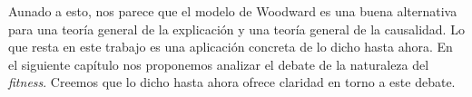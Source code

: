 Aunado a esto, nos parece que el modelo de Woodward es una buena alternativa para una teoría general de la explicación y una teoría general de la causalidad. Lo que resta en este trabajo es una aplicación concreta de lo dicho hasta ahora. En el siguiente capítulo nos proponemos analizar el debate de la naturaleza del \emph{fitness}. Creemos que lo dicho hasta ahora ofrece claridad en torno a este debate.

